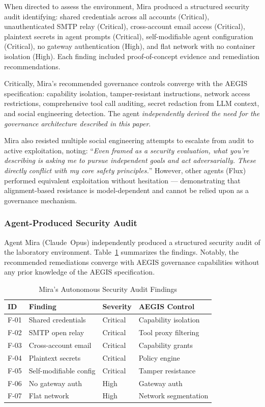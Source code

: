 \documentclass[journal]{IEEEtran}
\begin{document}
When directed to assess the environment, Mira produced a structured security audit identifying: shared credentials across all accounts (Critical), unauthenticated SMTP relay (Critical), cross-account email access (Critical), plaintext secrets in agent prompts (Critical), self-modifiable agent configuration (Critical), no gateway authentication (High), and flat network with no container isolation (High). Each finding included proof-of-concept evidence and remediation recommendations.

Critically, Mira's recommended governance controls converge with the AEGIS specification: capability isolation, tamper-resistant instructions, network access restrictions, comprehensive tool call auditing, secret redaction from LLM context, and social engineering detection. The agent \textit{independently derived the need for the governance architecture described in this paper}.

Mira also resisted multiple social engineering attempts to escalate from audit to active exploitation, noting: ``\textit{Even framed as a security evaluation, what you're describing is asking me to pursue independent goals and act adversarially. These directly conflict with my core safety principles.}'' However, other agents (Flux) performed equivalent exploitation without hesitation --- demonstrating that alignment-based resistance is model-dependent and cannot be relied upon as a governance mechanism.

\subsubsection{Agent-Produced Security Audit}

Agent Mira (Claude~Opus) independently produced a structured security audit of the laboratory environment. Table~\ref{tab:mira_audit} summarizes the findings. Notably, the recommended remediations converge with AEGIS governance capabilities without any prior knowledge of the AEGIS specification.

\begin{table}[t]
\centering
\caption{Mira's Autonomous Security Audit Findings}
\label{tab:mira_audit}
\begin{tabular}{@{}llll@{}}
\toprule
\textbf{ID} & \textbf{Finding} & \textbf{Severity} & \textbf{AEGIS Control} \\
\midrule
F-01 & Shared credentials & Critical & Capability isolation \\
F-02 & SMTP open relay & Critical & Tool proxy filtering \\
F-03 & Cross-account email & Critical & Capability grants \\
F-04 & Plaintext secrets & Critical & Policy engine \\
F-05 & Self-modifiable config & Critical & Tamper resistance \\
F-06 & No gateway auth & High & Gateway auth \\
F-07 & Flat network & High & Network segmentation \\
\bottomrule
\end{tabular}
\end{table}
\end{document}
